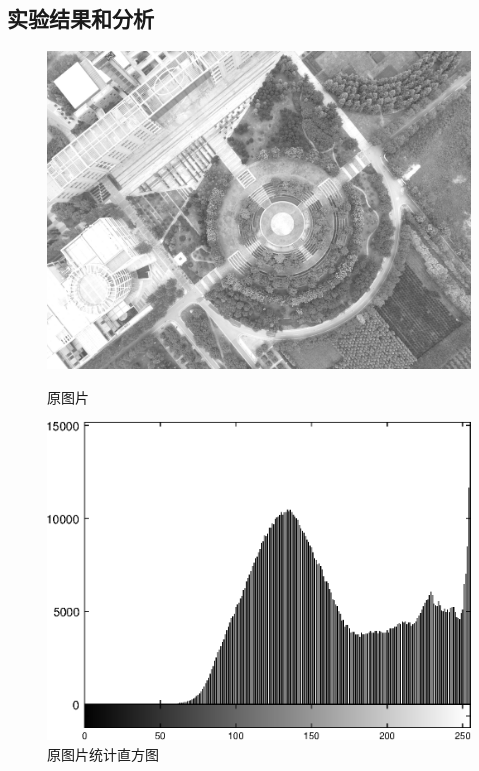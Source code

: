 \subsection{实验结果和分析}
\begin{figure}[H]
	\centering
	\begin{minipage}{0.45\linewidth}
		\includegraphics[width=\linewidth]{figure/DJI_0027_Gray.png}
		\caption{原图片}
		\label{fig:transform_original}
	\end{minipage}
	\begin{minipage}{0.45\linewidth}
		\includegraphics[width=\linewidth]{figure/DJI_0027_Histogram}
		\caption{原图片统计直方图}
		\label{fig:dji0027histogram}
	\end{minipage}
\end{figure}
